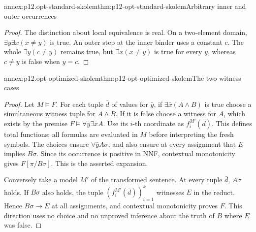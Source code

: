 \begin{annexitem}{annex:p12.opt-standard-skolem}{thm:p12-opt-standard-skolem}{Arbitrary inner and outer occurrences}
\begin{proof}
The distinction about local equivalence is real.
On a two-element domain, \(\exists y\exists x(x\ne y)\)
is true. An outer step at the inner binder uses a constant \(c\).
The whole \(\exists y(c\ne y)\) remains true, but
\(\exists x(x\ne y)\) is true for every \(y\), whereas
\(c\ne y\) is false when \(y=c\).
\end{proof}
\end{annexitem}

\begin{annexitem}{annex:p12.opt-optimized-skolem}{thm:p12-opt-optimized-skolem}{The two witness cases}
\begin{proof}
Let \(M\models F\). For each tuple \(\bar d\) of values for \(\bar y\),
if \(\exists\bar x(A\land B)\) is true choose a simultaneous
witness tuple for \(A\land B\). If it is false choose a witness
for \(A\), which exists by the premise
\(F\models\forall\bar y\exists\bar x A\).
Use its \(i\)-th coordinate as \(f_i^{M'}(\bar d)\).
This defines total functions; all formulas are evaluated in \(M\)
before interpreting the fresh symbols. The choices ensure
\(\forall\bar y A\sigma\), and also ensure at every assignment
that \(E\) implies \(B\sigma\). Since its occurrence is positive
in NNF, contextual monotonicity gives \(F[\pi/B\sigma]\).
This is the asserted expansion.

Conversely take a model \(M'\) of the transformed sentence.
At every tuple \(\bar d\), \(A\sigma\) holds. If \(B\sigma\)
also holds, the tuple \((f_i^{M'}(\bar d))_{i=1}^k\) witnesses
\(E\) in the reduct. Hence \(B\sigma\to E\) at all assignments,
and contextual monotonicity proves \(F\).
This direction uses no choice and no unproved inference about
the truth of \(B\) where \(E\) was false.
\end{proof}
\end{annexitem}

